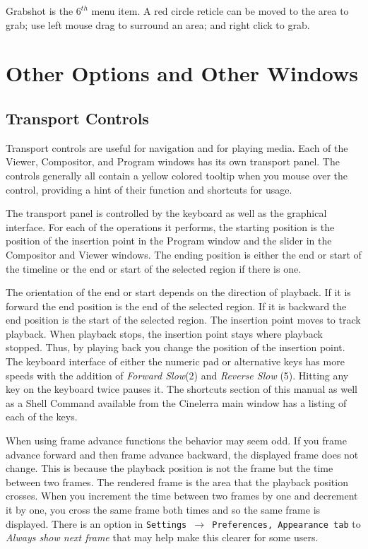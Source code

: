 Grabshot is the $6^{th}$ menu item.  
A red circle reticle can be moved to the area to grab; use left mouse drag to surround an area; and right click to grab.




\section{Other Options and Other Windows}%
\label{sec:other_options_and_other_windows}

\subsection{Transport Controls}%
\label{sub:transport_controls}

Transport controls are useful for navigation and for playing media.  
Each of the Viewer, Compositor, and Program windows has its own transport panel.  
The controls generally all contain a yellow colored tooltip when you mouse over the control, providing a hint of their function and shortcuts for usage.

The transport panel is controlled by the keyboard as well as the graphical interface. 
For each of the operations it performs, the starting position is the position of the insertion point in the Program window and the slider in the Compositor and Viewer windows. 
The ending position is either the end or start of the timeline or the end or start of the selected region if there is one.

The orientation of the end or start depends on the direction of playback. 
If it is forward the end position is the end of the selected region. 
If it is backward the end position is the start of the selected region.  
The insertion point moves to track playback. 
When playback stops, the insertion point stays where playback stopped. 
Thus, by playing back you change the position of the insertion point. 
The keyboard interface of either the numeric pad or alternative keys has more speeds with the addition of \emph{Forward Slow}(2) and \emph{Reverse Slow} (5).  
Hitting any key on the keyboard twice pauses it. 
The shortcuts section of this manual as well as a Shell Command available from the Cinelerra main window has a listing of each of the keys.

When using frame advance functions the behavior may seem odd. 
If you frame advance forward and then frame advance backward, the displayed frame does not change. 
This is because the playback position is not the frame but the time between two frames. 
The rendered frame is the area that the playback position crosses. 
When you increment the time between two frames by one and decrement it by one, you cross the same frame both times and so the same frame is displayed.  
There is an option in \texttt{Settings $\rightarrow$ Preferences, Appearance tab} to \textit{Always show next frame} that may help make this clearer for some users.

